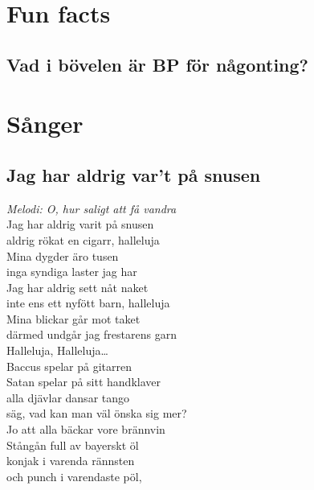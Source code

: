 \documentclass[a5paper]{article}
\begin{document}
	\newpage
	
	\section{Fun facts}
	
	\subsection{Vad i bövelen är BP för någonting?}
	
	\newpage
	
	\section{Sånger}
	
	\subsection{Jag har aldrig var't på snusen}
		\textit{Melodi: O, hur saligt att få vandra} \\
		
		\noindent 
		Jag har aldrig varit på snusen \\ 
		aldrig rökat en cigarr, halleluja \\ 
		Mina dygder äro tusen \\ 
		inga syndiga laster jag har \\ 
		Jag har aldrig sett nåt naket \\ 
		inte ens ett nyfött barn, halleluja \\ 
		Mina blickar går mot taket \\ 
		därmed undgår jag frestarens garn \\ 
		
		\noindent
		Halleluja, Halleluja… \\ 
		
		\noindent
		Baccus spelar på gitarren \\ 
		Satan spelar på sitt handklaver \\ 
		alla djävlar dansar tango \\ 
		säg, vad kan man väl önska sig mer? \\ 	
		
		\noindent
		Jo att alla bäckar vore brännvin \\
		Stångån full av bayerskt öl \\
		konjak i varenda rännsten \\
		och punch i varendaste pöl, \\
	
\end{document}
